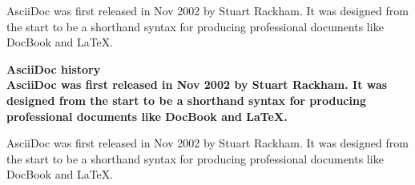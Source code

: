 \begin{sidebar}
AsciiDoc was first released in Nov 2002 by Stuart Rackham.
It was designed from the start to be a shorthand syntax
for producing professional documents like DocBook and LaTeX.
\end{sidebar}

\begin{sidebar}
\bf{AsciiDoc history}\\AsciiDoc was first released in Nov 2002 by Stuart Rackham.
It was designed from the start to be a shorthand syntax
for producing professional documents like DocBook and LaTeX.
\end{sidebar}

\begin{sidebar}
\hypertarget{origin}{AsciiDoc was first released in Nov 2002 by Stuart Rackham.
It was designed from the start to be a shorthand syntax
for producing professional documents like DocBook and LaTeX.
}
\end{sidebar}
